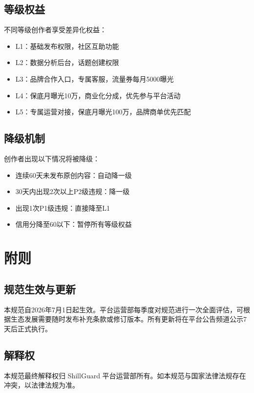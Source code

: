 \documentclass[a4paper,12pt]{article}
\begin{document}
\subsection{等级权益}

不同等级创作者享受差异化权益：

\begin{itemize}[noitemsep]
  \item L1：基础发布权限，社区互助功能
  \item L2：数据分析后台，话题创建权限
  \item L3：品牌合作入口，专属客服，流量券每月5000曝光
  \item L4：保底月曝光10万，商业化分成，优先参与平台活动
  \item L5：专属运营对接，保底月曝光100万，品牌商单优先匹配
\end{itemize}

\subsection{降级机制}

创作者出现以下情况将被降级：

\begin{itemize}[noitemsep]
  \item 连续60天未发布原创内容：自动降一级
  \item 30天内出现2次以上P2级违规：降一级
  \item 出现1次P1级违规：直接降至L1
  \item 信用分降至60以下：暂停所有等级权益
\end{itemize}

\section{附则}

\subsection{规范生效与更新}
本规范自2026年7月1日起生效。平台运营部每季度对规范进行一次全面评估，可根据生态发展需要随时发布补充条款或修订版本。所有更新将在平台公告频道公示7天后正式执行。

\subsection{解释权}
本规范最终解释权归 ShillGuard 平台运营部所有。如本规范与国家法律法规存在冲突，以法律法规为准。
\end{document}
